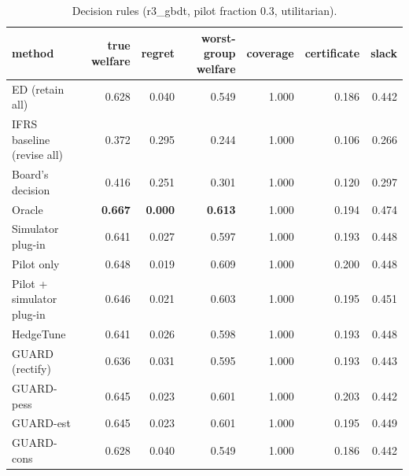 \begin{table}[t]
\centering
\small
\begin{tabular}{lrrrrrr}
\toprule
method & true welfare & regret & worst-group welfare & coverage & certificate & slack \\
\midrule
ED (retain all) & 0.628 & 0.040 & 0.549 & 1.000 & 0.186 & 0.442 \\
IFRS baseline (revise all) & 0.372 & 0.295 & 0.244 & 1.000 & 0.106 & 0.266 \\
Board's decision & 0.416 & 0.251 & 0.301 & 1.000 & 0.120 & 0.297 \\
Oracle & \textbf{0.667} & \textbf{0.000} & \textbf{0.613} & 1.000 & 0.194 & 0.474 \\
Simulator plug-in & 0.641 & 0.027 & 0.597 & 1.000 & 0.193 & 0.448 \\
Pilot only & 0.648 & 0.019 & 0.609 & 1.000 & 0.200 & 0.448 \\
Pilot + simulator plug-in & 0.646 & 0.021 & 0.603 & 1.000 & 0.195 & 0.451 \\
HedgeTune & 0.641 & 0.026 & 0.598 & 1.000 & 0.193 & 0.448 \\
GUARD (rectify) & 0.636 & 0.031 & 0.595 & 1.000 & 0.193 & 0.443 \\
GUARD-pess & 0.645 & 0.023 & 0.601 & 1.000 & 0.203 & 0.442 \\
GUARD-est & 0.645 & 0.023 & 0.601 & 1.000 & 0.195 & 0.449 \\
GUARD-cons & 0.628 & 0.040 & 0.549 & 1.000 & 0.186 & 0.442 \\
\bottomrule
\end{tabular}
\caption{Decision rules (r3\_gbdt, pilot fraction 0.3, utilitarian).}
\label{tab:methods-utilitarian}
\end{table}
